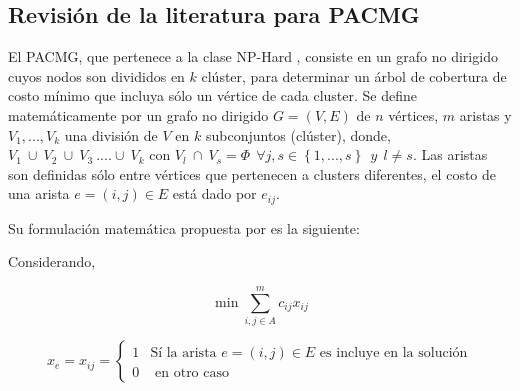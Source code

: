\subsection{Revisión de la literatura para PACMG}
\label{cap:rev_lit_pvv}



El PACMG, que pertenece a la clase NP-Hard \citep{dror2000generalized}, consiste en un grafo no dirigido cuyos nodos son divididos en $k$ clúster, para determinar un árbol de cobertura de costo mínimo que incluya sólo un vértice de cada cluster. Se define matemáticamente por un grafo no dirigido $G = (V,E)$ de $n$ vértices, $m$ aristas y $ V_{1},..., V_{k}$ una división de $V$ en $k$  subconjuntos (clúster), donde, $ V_{1}~\cup~V_{2}~\cup ~V_{3}~....\cup ~V_{k}$ con $ V_{l}~ \cap ~V_{s} = \Phi~~ \forall j,s \in \left \{1,...,s\right \}~~ y~~ l \neq s$. Las aristas son definidas sólo entre vértices que pertenecen a clusters diferentes, el costo de una arista $e = (i,j) \in E$ está dado por $e_{ij}$. %


Su formulación matemática propuesta por \cite{pop2002generalized} es la siguiente:

Considerando,

$$ \min \sum_{i, j \in A}^{m} c_{ij}x_{ij} $$
\vfill

$$
x_e = x_{ij} =
\left\{
\begin{array}{cl}
	1	& \mbox {Sí la arista } e = (i, j) \in E \mbox{ es incluye en la solución}\\
	0	& \mbox{ en otro caso}
\end{array}
\right.
$$

